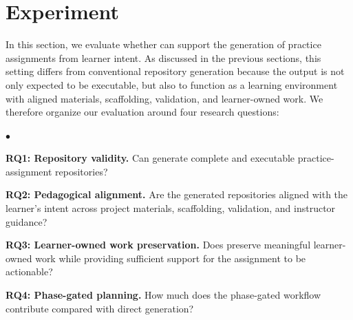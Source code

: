 \section{Experiment}

In this section, we evaluate whether \model can support the generation of practice assignments from learner intent.
As discussed in the previous sections, this setting differs from conventional repository generation because the output is not only expected to be executable, but also to function as a learning environment with aligned materials, scaffolding, validation, and learner-owned work.
We therefore organize our evaluation around four research questions:
\begin{list}{$\bullet$}{%
    \setlength{\leftmargin}{1em}
    \setlength{\labelwidth}{0.5em}
    \setlength{\labelsep}{0.3em}
    \setlength{\itemsep}{0.2em}
    \setlength{\topsep}{0.2em}
    \setlength{\parsep}{0pt}
}
    \item \textbf{RQ1: Repository validity.} Can \model generate complete and executable practice-assignment repositories?
    \item \textbf{RQ2: Pedagogical alignment.} Are the generated repositories aligned with the learner's intent across project materials, scaffolding, validation, and instructor guidance?
    \item \textbf{RQ3: Learner-owned work preservation.} Does \model preserve meaningful learner-owned work while providing sufficient support for the assignment to be actionable?
    \item \textbf{RQ4: Phase-gated planning.} How much does the phase-gated workflow contribute compared with direct generation?
\end{list}
